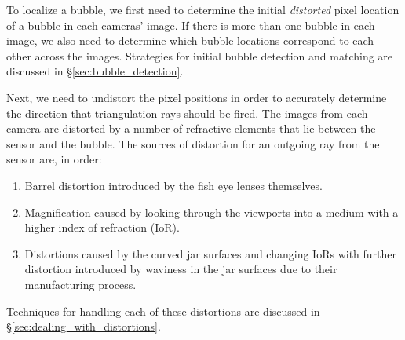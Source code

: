 \documentclass[11pt, letterpaper]{extarticle} %
\begin{document}
 To localize a bubble, we first need to determine the initial \textit{distorted} pixel location of a bubble in each cameras' image. If there is more than one bubble in each image, we also need to determine which bubble locations correspond to each other across the images. Strategies for initial bubble detection and matching are discussed in \S\ref{sec:bubble_detection}. 

Next, we need to undistort the pixel positions in order to accurately determine the direction that triangulation rays should be fired. The images from each camera are distorted by a number of refractive elements that lie between the sensor and the bubble. The sources of distortion for an outgoing ray from the sensor are, in order: 
\begin{enumerate}
    \item Barrel distortion introduced by the fish eye lenses themselves.
    \item Magnification caused by looking through the viewports into a medium with a higher index of refraction (IoR).
    \item Distortions caused by the curved jar surfaces and changing IoRs with further distortion introduced by waviness in the jar surfaces due to their manufacturing process.
\end{enumerate}
Techniques for handling each of these distortions are discussed in \S\ref{sec:dealing_with_distortions}.
\end{document}
